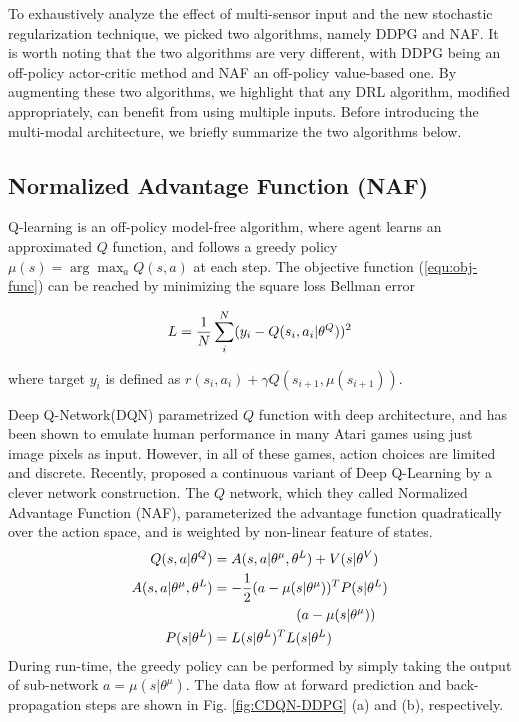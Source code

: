 \documentclass[../thesis.tex]{subfiles}
\begin{document}
To exhaustively analyze the effect of multi-sensor input and the new stochastic regularization technique, we picked two algorithms, namely DDPG and NAF. It is worth noting that the two algorithms are very different, with DDPG being an off-policy actor-critic method and NAF an off-policy value-based one. By augmenting these two algorithms, we highlight that any DRL algorithm, modified appropriately, can benefit from using multiple inputs. Before introducing the multi-modal architecture, we briefly summarize the two algorithms below.


\subsection{Normalized Advantage Function (NAF)} 
\label{sec:CDQN}

Q-learning \cite{sutton1999policy} is an off-policy model-free algorithm, where agent learns an approximated $Q$ function, and follows a greedy policy $\mu(s)=\arg\max_aQ(s,a)$ at each step. The objective function (\ref{equ:obj-func}) can be reached by minimizing the square loss Bellman error

\begin{align}
\centering
L = \frac{1}{N} \sum_i^N (y_i-Q(s_i,a_i|\theta^Q))^2
\end{align}

where target $y_i$ is defined as $r(s_i,a_i) + \gamma Q(s_{i+1},\mu(s_{i+1}))$.


Deep Q-Network(DQN) parametrized $Q$ function with deep architecture\cite{mnih2013playing}, and has been shown to emulate human performance \cite{mnih2015human} in many Atari games using just image pixels as input. However, in all of these games, action choices are limited and discrete. Recently, \citet{CDQN} proposed a continuous variant of Deep Q-Learning by a clever network construction. The $Q$ network, which they called Normalized Advantage Function (NAF), parameterized the advantage function quadratically over the action space, and is weighted by non-linear feature of states. 
\begin{align}
\centering
Q(s,a|\theta^Q) &= A(s,a | \theta^\mu, \theta^L) + V(s|\theta^V) \\
A(s,a | \theta^\mu, \theta^L) &= -\frac{1}{2}(a-\mu(s|\theta^\mu))^T P(s|\theta^L)\nonumber \\
&\qquad \qquad \qquad(a-\mu(s|\theta^\mu)) \label{equ:NAF} \\
P(s|\theta^L) &= L(s|\theta^L)^TL(s|\theta^L) \label{equ:P}
\end{align}
During run-time, the greedy policy can be performed by simply taking the output of sub-network $a = \mu(s|\theta^\mu)$. The data flow at forward prediction and back-propagation steps are shown in Fig. \ref{fig:CDQN-DDPG} (a) and (b), respectively.
\end{document}
